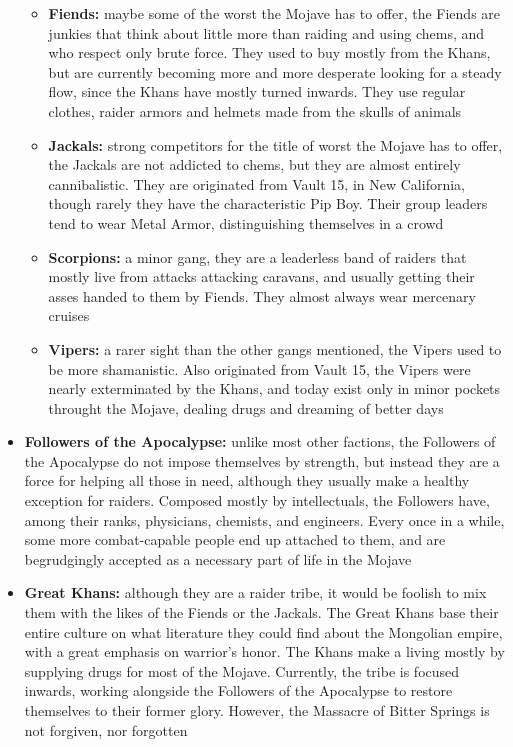 \documentclass[11pt]{article} %
\begin{document}
\begin{itemize}
\begin{itemize}
\item \textbf{Fiends:} maybe some of the worst the Mojave has to offer, the Fiends are junkies that think about little more than raiding and using chems, and who respect only brute force. They used to buy mostly from the Khans, but are currently becoming more and more desperate looking for a steady flow, since the Khans have mostly turned inwards. They use regular clothes, raider armors and helmets made from the skulls of animals

\item \textbf{Jackals:} strong competitors for the title of worst the Mojave has to offer, the Jackals are not addicted to chems, but they are almost entirely cannibalistic. They are originated from Vault 15, in New California, though rarely they have the characteristic Pip Boy. Their group leaders tend to wear Metal Armor, distinguishing themselves in a crowd

\item \textbf{Scorpions:} a minor gang, they are a leaderless band of raiders that mostly live from attacks attacking caravans, and usually getting their asses handed to them by Fiends. They almost always wear mercenary cruises

\item \textbf{Vipers:} a rarer sight than the other gangs mentioned, the Vipers used to be more shamanistic. Also originated from Vault 15, the Vipers were nearly exterminated by the Khans, and today exist only in minor pockets throught the Mojave, dealing drugs and dreaming of better days
\end{itemize}

\item \textbf{Followers of the Apocalypse:} unlike most other factions, the Followers of the Apocalypse do not impose themselves by strength, but instead they are a force for helping all those in need, although they usually make a healthy exception for raiders. Composed mostly by intellectuals, the Followers have, among their ranks, physicians, chemists, and engineers. Every once in a while, some more combat-capable people end up attached to them, and are begrudgingly accepted as a necessary part of life in the Mojave

\item \textbf{Great Khans:} although they are a raider tribe, it would be foolish to mix them with the likes of the Fiends or the Jackals. The Great Khans base their entire culture on what literature they could find about the Mongolian empire, with a great emphasis on warrior's honor. The Khans make a living mostly by supplying drugs for most of the Mojave. Currently, the tribe is focused inwards, working alongside the Followers of the Apocalypse to restore themselves to their former glory. However, the Massacre of Bitter Springs is not forgiven, nor forgotten


\end{itemize}
\end{document}
